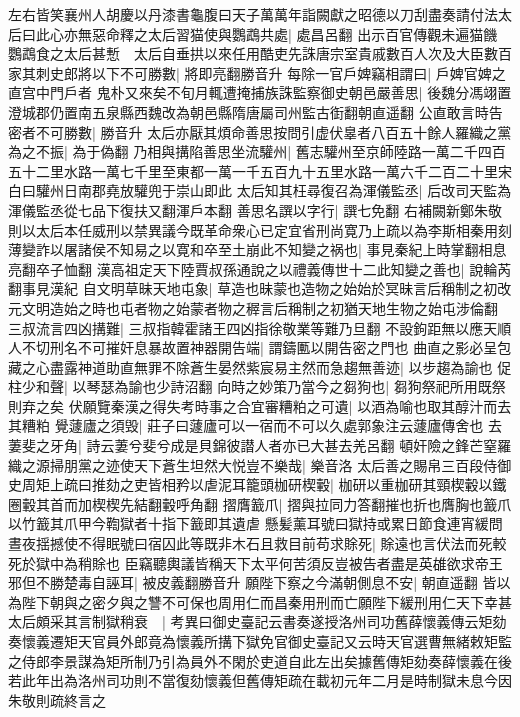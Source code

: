 左右皆笑襄州人胡慶以丹漆書龜腹曰天子萬萬年詣闕獻之昭德以刀刮盡奏請付法太后曰此心亦無惡命釋之太后習猫使與鸚鵡共處|{
	處昌呂翻}
出示百官傳觀未遍猫饑鸚鵡食之太后甚慙　太后自垂拱以來任用酷吏先誅唐宗室貴戚數百人次及大臣數百家其刺史郎將以下不可勝數|{
	將即亮翻勝音升}
每除一官戶婢竊相謂曰|{
	戶婢官婢之直宫中門戶者}
鬼朴又來矣不旬月輒遭掩捕族誅監察御史朝邑嚴善思|{
	後魏分馮翊置澄城郡仍置南五泉縣西魏改為朝邑縣隋唐屬司州監古衘翻朝直遥翻}
公直敢言時告密者不可勝數|{
	勝音升}
太后亦厭其煩命善思按問引虚伏辠者八百五十餘人羅織之黨為之不振|{
	為于偽翻}
乃相與搆陷善思坐流驩州|{
	舊志驩州至京師陸路一萬二千四百五十二里水路一萬七千里至東都一萬一千五百九十五里水路一萬六千二百二十里宋白曰驩州日南郡堯放驩兜于崇山即此}
太后知其枉尋復召為渾儀監丞|{
	后改司天監為渾儀監丞從七品下復扶又翻渾戶本翻}
善思名譔以字行|{
	譔七免翻}
右補闕新鄭朱敬則以太后本任威刑以禁異議今既革命衆心已定宜省刑尚寛乃上疏以為李斯相秦用刻薄變詐以屠諸侯不知易之以寛和卒至土崩此不知變之祸也|{
	事見秦紀上時掌翻相息亮翻卒子恤翻}
漢高祖定天下陸賈叔孫通說之以禮義傳世十二此知變之善也|{
	說輪芮翻事見漢紀}
自文明草昧天地屯象|{
	草造也昧蒙也造物之始始於冥昧言后稱制之初改元文明造始之時也屯者物之始蒙者物之稺言后稱制之初猶天地生物之始屯涉倫翻}
三叔流言四凶搆難|{
	三叔指韓霍諸王四凶指徐敬業等難乃旦翻}
不設鉤距無以應天順人不切刑名不可摧奸息暴故置神器開告端|{
	謂鑄匭以開告密之門也}
曲直之影必呈包藏之心盡露神道助直無罪不除蒼生晏然紫宸易主然而急趨無善迹|{
	以步趨為諭也}
促柱少和聲|{
	以琴瑟為諭也少詩沼翻}
向時之妙策乃當今之芻狗也|{
	芻狗祭祀所用既祭則弃之矣}
伏願覽秦漢之得失考時事之合宜審糟粕之可遺|{
	以酒為喻也取其醇汁而去其糟粕}
覺蘧廬之須毁|{
	莊子曰蘧廬可以一宿而不可以久處郭象注云蘧廬傳舍也}
去萋斐之牙角|{
	詩云萋兮斐兮成是貝錦彼譛人者亦已大甚去羌呂翻}
頓奸險之鋒芒窒羅織之源掃朋黨之迹使天下蒼生坦然大悦豈不樂哉|{
	樂音洛}
太后善之賜帛三百段侍御史周矩上疏曰推劾之吏皆相矜以虐泥耳籠頭枷研楔轂|{
	枷研以重枷研其頸楔轂以鐵圈轂其首而加楔楔先結翻轂呼角翻}
摺膺籖爪|{
	摺與拉同力答翻摧也折也膺胸也籖爪以竹籖其爪甲今鞫獄者十指下籖即其遺虐}
懸髪薰耳號曰獄持或累日節食連宵緩問晝夜揺撼使不得眠號曰宿囚此等既非木石且救目前苟求賖死|{
	賖遠也言伏法而死較死於獄中為稍賖也}
臣竊聽輿議皆稱天下太平何苦須反豈被告者盡是英䧺欲求帝王邪但不勝楚毒自誣耳|{
	被皮義翻勝音升}
願陛下察之今滿朝側息不安|{
	朝直遥翻}
皆以為陛下朝與之密夕與之讐不可保也周用仁而昌秦用刑而亡願陛下緩刑用仁天下幸甚太后頗采其言制獄稍衰　|{
	考異曰御史臺記云書奏遂授洛州司功舊薛懷義傳云矩劾奏懷義遷矩天官員外郎竟為懷義所搆下獄免官御史臺記又云時天官選曹無緒敕矩監之侍郎李景謀為矩所制乃引為員外不閑於吏道自此左出矣據舊傳矩劾奏薛懷義在後若此年出為洛州司功則不當復劾懷義但舊傳矩疏在載初元年二月是時制獄未息今因朱敬則疏終言之}

